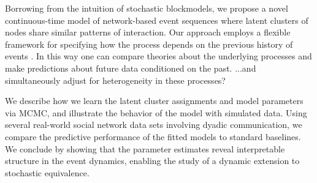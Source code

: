 %

Borrowing from the intuition of stochastic blockmodels, we propose a novel continuous-time model of network-based event sequences where latent clusters of nodes share similar patterns of interaction.
Our approach employs a flexible framework for  specifying how the process depends on the previous history of events \cite{AalenOddO.2008, Butts2008}.
In this way one can compare theories about the underlying processes and make predictions about future data conditioned on the past.
{\color{red} ...and simultaneously adjust for heterogeneity in these
  processes?}

We describe how we learn the latent cluster assignments and model parameters via MCMC, and illustrate the behavior of the model with simulated data.
Using several real-world social network data sets involving dyadic communication, we compare the predictive performance of the fitted models to standard baselines.
We conclude by showing that the parameter estimates reveal interpretable structure in the event dynamics, enabling the study of a dynamic extension to stochastic equivalence.

